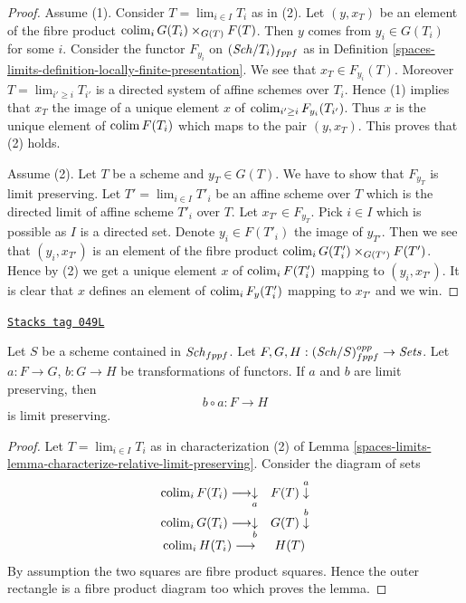 \begin{proof}
Assume (1). Consider $T = \lim_{i \in I} T_i$ as in (2). Let
$(y, x_T)$ be an element of the fibre product
$\operatorname{colim}_i G(T_i) \times_{G(T)} F(T)$.
Then $y$ comes from $y_i \in G(T_i)$ for some $i$.
Consider the functor $F_{y_i}$ on $(\mathit{Sch}/T_i)_{fppf}$ as in
Definition \ref{spaces-limits-definition-locally-finite-presentation}.
We see that $x_T \in F_{y_i}(T)$. Moreover $T = \lim_{i' \geq i} T_{i'}$
is a directed system of affine schemes over $T_i$. Hence (1) implies
that $x_T$ the image of a unique element $x$ of
$\operatorname{colim}_{i' \geq i} F_{y_i}(T_{i'})$. Thus $x$ is the unique
element of $\operatorname{colim} F(T_i)$ which maps to the pair $(y, x_T)$.
This proves that (2) holds.

\medskip\noindent
Assume (2). Let $T$ be a scheme and $y_T \in G(T)$. We have to show that
$F_{y_T}$ is limit preserving. Let $T' = \lim_{i \in I} T'_i$ be an
affine scheme over $T$ which is the directed limit of affine scheme $T'_i$
over $T$. Let $x_{T'} \in F_{y_T}$. Pick $i \in I$ which is possible as
$I$ is a directed set. Denote $y_i \in F(T'_i)$ the
image of $y_{T'}$. Then we see that $(y_i, x_{T'})$ is an
element of the fibre product
$\operatorname{colim}_i G(T'_i) \times_{G(T')} F(T')$.
Hence by (2) we get a unique element $x$ of $\operatorname{colim}_i F(T'_i)$
mapping to $(y_i, x_{T'})$. It is clear that $x$ defines an element
of $\operatorname{colim}_i F_y(T'_i)$ mapping to $x_{T'}$ and we win.
\end{proof}

\begin{lemma}
\label{spaces-limits-lemma-composition-locally-finite-presentation}
\href{https://stacks.math.columbia.edu/tag/049L}{\texttt{Stacks tag 049L}}

Let $S$ be a scheme contained in $\mathit{Sch}_{fppf}$.
Let $F, G, H : (\mathit{Sch}/S)_{fppf}^{opp} \to \textit{Sets}$.
Let $a : F \to G$, $b : G \to H$ be transformations of functors.
If $a$ and $b$ are limit preserving, then
$$
b \circ a : F \longrightarrow H
$$
is limit preserving.
\end{lemma}

\begin{proof}
Let $T = \lim_{i \in I} T_i$ as in characterization (2) of
Lemma \ref{spaces-limits-lemma-characterize-relative-limit-preserving}.
Consider the diagram of sets
$$
\begin{array}{cc}\operatorname{colim}_i F(T_i) \longrightarrow\underset{a}{\downarrow} & F(T) \overset{a}{\downarrow} \\ \operatorname{colim}_i G(T_i) \longrightarrow\underset{b}{\downarrow} & G(T) \overset{b}{\downarrow} \\ \operatorname{colim}_i H(T_i) \longrightarrow & H(T)\end{array}
$$
By assumption the two squares are fibre product squares. Hence the
outer rectangle is a fibre product diagram too which proves the lemma.
\end{proof}

